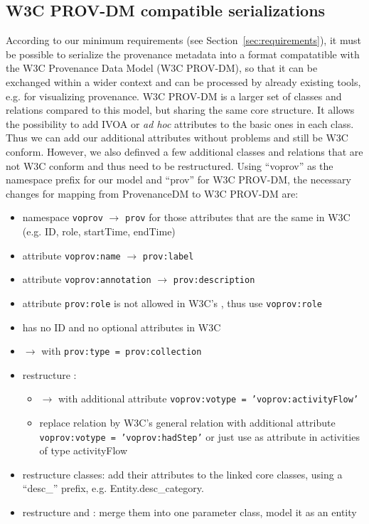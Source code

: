 \subsection{W3C PROV-DM compatible serializations}\label{sec:w3cserialization}
According to our minimum requirements (see Section~\ref{sec:requirements}), it must be possible to
serialize the provenance metadata into a format compatatible with the W3C Provenance Data Model (W3C PROV-DM), so that it can be exchanged within a wider context and can be processed by already existing tools, e.g. for visualizing provenance.
W3C PROV-DM is a larger set of classes and relations compared to this model, but sharing the same core structure. It allows the possibility to add IVOA or \textit{ad hoc} attributes to the basic ones in each class. Thus we can add our additional attributes without problems and still be W3C conform. However, we also definved a few additional classes and relations that are not W3C conform and thus need to be restructured.
Using ``voprov'' as the namespace prefix for our model and ``prov'' for W3C PROV-DM, the necessary changes for mapping from ProvenanceDM to W3C PROV-DM are:

\begin{itemize}
\item namespace \texttt{voprov} $\rightarrow$ \texttt{prov} for those attributes that are the same in W3C (e.g. ID, role, startTime, endTime)
\item attribute \texttt{voprov:name} $\rightarrow$ \texttt{prov:label}
\item attribute \texttt{voprov:annotation} $\rightarrow$ \texttt{prov:description}
\item attribute \texttt{prov:role} is not allowed in W3C's , thus use \texttt{voprov:role}
\item {} has no ID and no optional attributes in W3C
\item {} $\rightarrow$  with \texttt{prov:type = prov:collection}
\item restructure :
	\begin{itemize}
	\item {} $\rightarrow$  with additional attribute \texttt{voprov:votype = 'voprov:activityFlow'}
	\item replace  relation by W3C's general  relation with additional attribute \texttt{voprov:votype = 'voprov:hadStep'} or just use  as attribute in activities of type activityFlow
	\end{itemize}
\item restructure  classes: add their attributes to the linked core classes, using a ``desc\_'' prefix, e.g. Entity.desc\_category.
\item restructure  and :
merge them into one parameter class, model it as an entity

\end{itemize}

